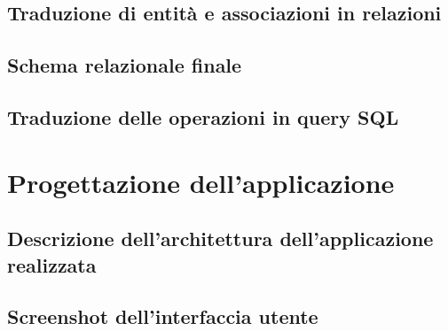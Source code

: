 \documentclass[12pt,a4paper]{report}
\begin{document}
\section{Traduzione di entità e associazioni in relazioni}
\section{Schema relazionale finale}
\section{Traduzione delle operazioni in query SQL}

\chapter{Progettazione dell'applicazione}
\section{Descrizione dell'architettura dell'applicazione realizzata}
\section{Screenshot dell'interfaccia utente}
\end{document}
